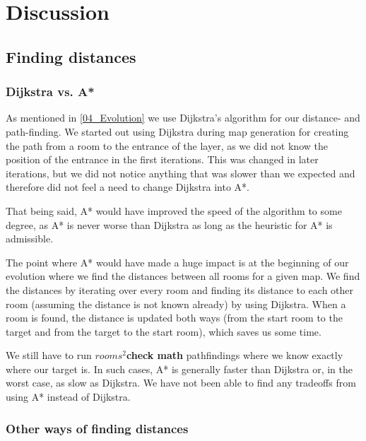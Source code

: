\section{Discussion}
\label{06}


\subsection{Finding distances}
\label{06_Distances}

\subsubsection{Dijkstra vs. A*}

As mentioned in \ref{04_Evolution} we use Dijkstra's algorithm for our distance- and path-finding. We started out using Dijkstra during map generation for creating the path from a room to the entrance of the layer, as we did not know the position of the entrance in the first iterations. This was changed in later iterations, but we did not notice anything that was slower than we expected and therefore did not feel a need to change Dijkstra into A*.

That being said, A* would have improved the speed of the algorithm to some degree, as A* is never worse than Dijkstra as long as the heuristic for A* is admissible.

The point where A* would have made a huge impact is at the beginning of our evolution where we find the distances between all rooms for a given map. We find the distances by iterating over every room and finding its distance to each other room (assuming the distance is not known already) by using Dijkstra. When a room is found, the distance is updated both ways (from the start room to the target and from the target to the start room), which saves us some time.

We still have to run $rooms^2$\textbf{check math} pathfindings where we know exactly where our target is. In such cases, A* is generally faster than Dijkstra or, in the worst case, as slow as Dijkstra. We have not been able to find any tradeoffs from using A* instead of Dijkstra.

\subsubsection{Other ways of finding distances}

